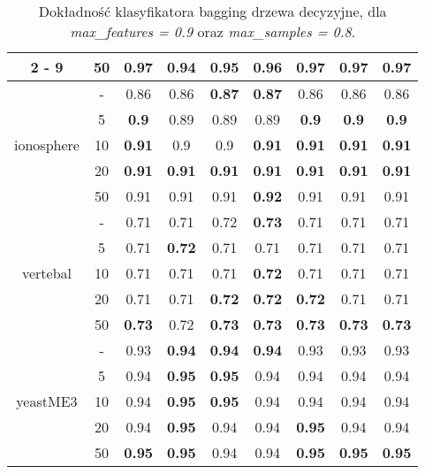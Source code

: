 \begin{table}[H]
\begin{center}
{\begin{tabular}{c|c|ccccccc}
				\cline{2%
					-%
					9}%
				&50&\textbf{0.97}&0.94&0.95&0.96&\textbf{0.97}&\textbf{0.97}&\textbf{0.97}\\%
				\hline%
				\multirow{5}{*}{ionosphere}&{-}&0.86&0.86&\textbf{0.87}&\textbf{0.87}&0.86&0.86&0.86\\%
				\cline{2%
					-%
					9}%
				&5&\textbf{0.9}&0.89&0.89&0.89&\textbf{0.9}&\textbf{0.9}&\textbf{0.9}\\%
				\cline{2%
					-%
					9}%
				&10&\textbf{0.91}&0.9&0.9&\textbf{0.91}&\textbf{0.91}&\textbf{0.91}&\textbf{0.91}\\%
				\cline{2%
					-%
					9}%
				&20&\textbf{0.91}&\textbf{0.91}&\textbf{0.91}&\textbf{0.91}&\textbf{0.91}&\textbf{0.91}&\textbf{0.91}\\%
				\cline{2%
					-%
					9}%
				&50&0.91&0.91&0.91&\textbf{0.92}&0.91&0.91&0.91\\%
				\hline%
				\multirow{5}{*}{vertebal}&{-}&0.71&0.71&0.72&\textbf{0.73}&0.71&0.71&0.71\\%
				\cline{2%
					-%
					9}%
				&5&0.71&\textbf{0.72}&0.71&0.71&0.71&0.71&0.71\\%
				\cline{2%
					-%
					9}%
				&10&0.71&0.71&0.71&\textbf{0.72}&0.71&0.71&0.71\\%
				\cline{2%
					-%
					9}%
				&20&0.71&0.71&\textbf{0.72}&\textbf{0.72}&\textbf{0.72}&0.71&0.71\\%
				\cline{2%
					-%
					9}%
				&50&\textbf{0.73}&0.72&\textbf{0.73}&\textbf{0.73}&\textbf{0.73}&\textbf{0.73}&\textbf{0.73}\\%
				\hline%
				\multirow{5}{*}{yeastME3}&{-}&0.93&\textbf{0.94}&\textbf{0.94}&\textbf{0.94}&0.93&0.93&0.93\\%
				\cline{2%
					-%
					9}%
				&5&0.94&\textbf{0.95}&\textbf{0.95}&0.94&0.94&0.94&0.94\\%
				\cline{2%
					-%
					9}%
				&10&0.94&\textbf{0.95}&\textbf{0.95}&0.94&0.94&0.94&0.94\\%
				\cline{2%
					-%
					9}%
				&20&0.94&\textbf{0.95}&0.94&0.94&\textbf{0.95}&0.94&0.94\\%
				\cline{2%
					-%
					9}%
				&50&\textbf{0.95}&\textbf{0.95}&0.94&0.94&\textbf{0.95}&\textbf{0.95}&\textbf{0.95}\\%
				\hline%
			\end{tabular}}
			\caption{Dokładność klasyfikatora bagging drzewa decyzyjne, dla \textit{max\_features = 0.9} oraz \textit{max\_samples = 0.8}.}
			\label{baggingdrzewoacc2}
		\end{center}
	\end{table}
